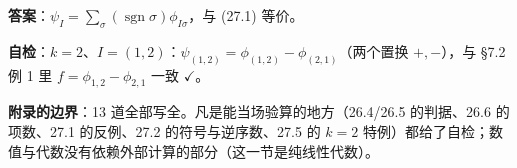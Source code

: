 \documentclass[11pt]{ctexart}
\newcommand{\sgn}{\operatorname{sgn}}
\begin{document}
\textbf{答案}：$\psi_I=\sum_\sigma(\sgn\sigma)\phi_{I\sigma}$，与 (27.1) 等价。

\textbf{自检}：$k=2$、$I=(1,2)$：$\psi_{(1,2)}=\phi_{(1,2)}-\phi_{(2,1)}$（两个置换 $+,-$），与 §7.2 例 1 里 $f=\phi_{1,2}-\phi_{2,1}$ 一致 $\checkmark$。

\begin{notecall}
\textbf{附录的边界}：13 道全部写全。凡是能当场验算的地方（26.4/26.5 的判据、26.6 的项数、27.1 的反例、27.2 的符号与逆序数、27.5 的 $k=2$ 特例）都给了自检；数值与代数没有依赖外部计算的部分（这一节是纯线性代数）。
\end{notecall}
\end{document}
